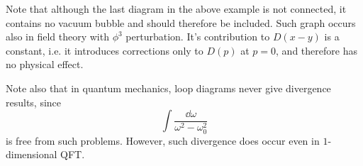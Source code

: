 \documentclass{article}
\begin{document}
Note that although the last diagram in the above example is not connected, it contains no vacuum bubble and should therefore be included.
Such graph occurs also in field theory with $\phi^3$ perturbation.
It's contribution to $D(x-y)$ is a constant, i.e. it introduces corrections only to $D(p)$ at $p=0$, and therefore has no physical effect.
\par
Note also that in quantum mechanics, loop diagrams never give divergence results, since
\[ \int \frac{\dd{\omega}}{\omega^2 - \omega_0^2} \]
is free from such problems.
However, such divergence does occur even in $1$-dimensional QFT.

% 
% 
\end{document}
